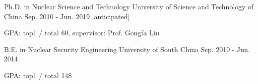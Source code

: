 

\begin{cventries}

\cventry
{Ph.D. in Nuclear Science and Technology} %
{University of Science and Technology of China} %
{} %
{Sep. 2010 - Jun. 2019 [anticipated]} %
{
	\begin{cvitems} %
		\item {GPA: top1 / total 60, supervisor: Prof. Gongfa Liu}
	\end{cvitems}
}

  \cventry
    {B.E. in Nuclear Security Engineering} %
    {University of South China} %
    {} %
    {Sep. 2010 - Jun. 2014} %
    {
      \begin{cvitems} %
        \item {GPA: top1 / total 148}
      \end{cvitems}
    }

\end{cventries}
